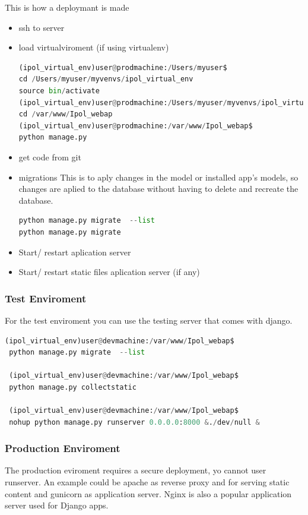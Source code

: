 This is how a deploymant is made

\begin{itemize}
\item  ssh to server 
\item  load virtualviroment (if using virtualenv)
\begin{lstlisting}[language=Python,firstnumber=1]
(ipol_virtual_env)user@prodmachine:/Users/myuser$
cd /Users/myuser/myvenvs/ipol_virtual_env
source bin/activate
(ipol_virtual_env)user@prodmachine:/Users/myuser/myvenvs/ipol_virtual_env$
cd /var/www/Ipol_webap
(ipol_virtual_env)user@prodmachine:/var/www/Ipol_webap$ 
python manage.py 
\end{lstlisting}
\item  get code from git
\item  migrations
This is to aply changes in the model or installed app's models, so changes are aplied to the database without having to delete and recreate the database.
\begin{lstlisting}[language=Python,firstnumber=1]
python manage.py migrate  --list
python manage.py migrate
\end{lstlisting}
\item  Start/ restart aplication server
\item  Start/ restart static files aplication server (if any)

\end{itemize}



\subsubsection{Test Enviroment}
For the test enviroment you can use the testing server that comes with django.

\begin{lstlisting}[language=Python,firstnumber=1]
 (ipol_virtual_env)user@devmachine:/var/www/Ipol_webap$ 
 python manage.py migrate  --list
 
 (ipol_virtual_env)user@devmachine:/var/www/Ipol_webap$ 
 python manage.py collectstatic
 
 (ipol_virtual_env)user@devmachine:/var/www/Ipol_webap$ 
 nohup python manage.py runserver 0.0.0.0:8000 &./dev/null &
\end{lstlisting}


\subsubsection{Production Enviroment}
The production eviroment requires a secure deployment, yo cannot user runserver. An example could be apache as reverse proxy and for serving static content and gunicorn as application server. Nginx is also a popular application server used for Django apps.


